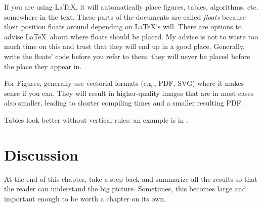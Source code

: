 If you are using \LaTeX, it will automatically place figures, tables,
algorithms, etc. somewhere in the text. These parts of the documents are
called \emph{floats} because their position floats around depending on
\LaTeX`s will. There are options to advise \LaTeX~about where floats
should be placed. My advice is not to waste too much time on this and
trust that they will end up in a good place. Generally, write the
floats' code before you refer to them: they will never be placed before
the place they appear in.

For Figures, generally use vectorial formats (e.g., PDF, SVG) where it
makes sense if you can. They will result in higher-quality images that
are in most cases also smaller, leading to shorter compiling times and a
smaller resulting PDF.

Tables look better without vertical rules: an example is in
.

\section{Discussion}

At the end of this chapter, take a step back and summarize all the
results so that the reader can understand the big picture. Sometimes,
this becomes large and important enough to be worth a chapter on its
own.
